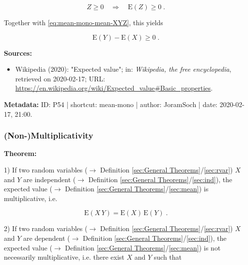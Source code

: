 \documentclass[a4paper,12pt,twoside]{book}
\begin{document}
\begin{equation} \label{eq:mean-mono-mean-Z}
Z \geq 0 \quad \Rightarrow \quad \mathrm{E}(Z) \geq 0 \; .
\end{equation}

Together with \eqref{eq:mean-mono-mean-XYZ}, this yields

\begin{equation} \label{eq:mean-mono-mean-mono-qed}
\mathrm{E}(Y) - \mathrm{E}(X) \geq 0 \; .
\end{equation}


\vspace{1em}
\textbf{Sources:}
\begin{itemize}
\item Wikipedia (2020): "Expected value"; in: \textit{Wikipedia, the free encyclopedia}, retrieved on 2020-02-17; URL: \url{https://en.wikipedia.org/wiki/Expected_value#Basic_properties}.
\end{itemize}


\vspace{1em}
\textbf{Metadata:} ID: P54 | shortcut: mean-mono | author: JoramSoch | date: 2020-02-17, 21:00.
\vspace{1em}



\subsubsection[\textbf{(Non-)Multiplicativity}]{(Non-)Multiplicativity} \label{sec:mean-mult}
\setcounter{equation}{0}

\textbf{Theorem:}

1) If two random variables ($\rightarrow$ Definition \ref{sec:General Theorems}/\ref{sec:rvar}) $X$ and $Y$ are independent ($\rightarrow$ Definition \ref{sec:General Theorems}/\ref{sec:ind}), the expected value ($\rightarrow$ Definition \ref{sec:General Theorems}/\ref{sec:mean}) is multiplicative, i.e.

\begin{equation} \label{eq:mean-mult-mean-mult}
\mathrm{E}(X\,Y) = \mathrm{E}(X) \, \mathrm{E}(Y) \; .
\end{equation}

2) If two random variables ($\rightarrow$ Definition \ref{sec:General Theorems}/\ref{sec:rvar}) $X$ and $Y$ are dependent ($\rightarrow$ Definition \ref{sec:General Theorems}/\ref{sec:ind}), the expected value ($\rightarrow$ Definition \ref{sec:General Theorems}/\ref{sec:mean}) is not necessarily multiplicative, i.e. there exist $X$ and $Y$ such that
\end{document}
